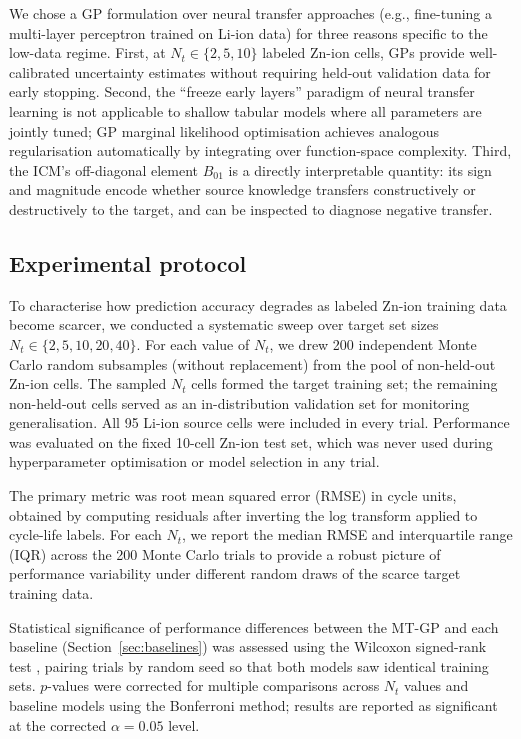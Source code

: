 We chose a GP formulation over neural transfer approaches (e.g., fine-tuning
a multi-layer perceptron trained on Li-ion data) for three reasons specific
to the low-data regime.  First, at $N_t \in \{2,5,10\}$ labeled Zn-ion
cells, GPs provide well-calibrated uncertainty estimates without requiring
held-out validation data for early stopping.  Second, the ``freeze early
layers'' paradigm of neural transfer learning is not applicable to
shallow tabular models where all parameters are jointly tuned; GP
marginal likelihood optimisation achieves analogous regularisation
automatically by integrating over function-space complexity.  Third, the
ICM's off-diagonal element $B_{01}$ is a directly interpretable quantity:
its sign and magnitude encode whether source knowledge transfers
constructively or destructively to the target, and can be inspected
to diagnose negative transfer.

\subsection{Experimental protocol}
\label{sec:protocol}

To characterise how prediction accuracy degrades as labeled Zn-ion training
data become scarcer, we conducted a systematic sweep over target set sizes
$N_t \in \{2, 5, 10, 20, 40\}$.  For each value of $N_t$, we drew 200
independent Monte Carlo random subsamples (without replacement) from the
pool of non-held-out Zn-ion cells.  The sampled $N_t$ cells formed the
target training set; the remaining non-held-out cells served as an
in-distribution validation set for monitoring generalisation.  All 95 Li-ion
source cells were included in every trial.  Performance was evaluated on the
fixed 10-cell Zn-ion test set, which was never used during hyperparameter
optimisation or model selection in any trial.

The primary metric was root mean squared error (RMSE) in cycle units,
obtained by computing residuals after inverting the log transform applied to
cycle-life labels.  For each $N_t$, we report the median RMSE and
interquartile range (IQR) across the 200 Monte Carlo trials to provide
a robust picture of performance variability under different random draws of
the scarce target training data.

Statistical significance of performance differences between the MT-GP and each
baseline (Section~\ref{sec:baselines}) was assessed using the Wilcoxon
signed-rank test \cite{wilcoxon1945}, pairing trials by random seed so that
both models saw identical training sets.  $p$-values were corrected for
multiple comparisons across $N_t$ values and baseline models using the
Bonferroni method; results are reported as significant at the corrected
$\alpha = 0.05$ level.

